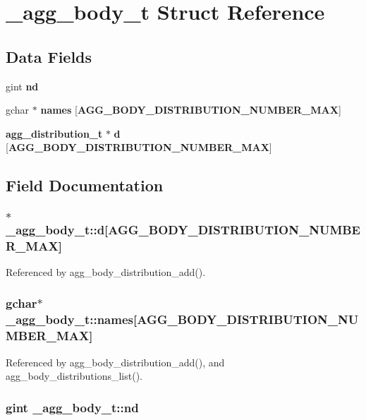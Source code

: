 \section{\+\_\+agg\+\_\+body\+\_\+t Struct Reference}
\label{struct__agg__body__t}
\subsection*{Data Fields}
\begin{DoxyCompactItemize}
\item 
gint {\bf nd}
\item 
gchar $\ast$ {\bf names} [{\bf A\+G\+G\+\_\+\+B\+O\+D\+Y\+\_\+\+D\+I\+S\+T\+R\+I\+B\+U\+T\+I\+O\+N\+\_\+\+N\+U\+M\+B\+E\+R\+\_\+\+M\+A\+X}]
\item 
{\bf agg\+\_\+distribution\+\_\+t} $\ast$ {\bf d} [{\bf A\+G\+G\+\_\+\+B\+O\+D\+Y\+\_\+\+D\+I\+S\+T\+R\+I\+B\+U\+T\+I\+O\+N\+\_\+\+N\+U\+M\+B\+E\+R\+\_\+\+M\+A\+X}]
\end{DoxyCompactItemize}


\subsection{Field Documentation}
\subsubsection[{d}]{$\ast$ \+\_\+agg\+\_\+body\+\_\+t\+::d[{\bf A\+G\+G\+\_\+\+B\+O\+D\+Y\+\_\+\+D\+I\+S\+T\+R\+I\+B\+U\+T\+I\+O\+N\+\_\+\+N\+U\+M\+B\+E\+R\+\_\+\+M\+A\+X}]}\label{struct__agg__body__t_ac459fd4ca7bdf550abc897bee54281eb}


Referenced by agg\+\_\+body\+\_\+distribution\+\_\+add().

\subsubsection[{names}]{\setlength{\rightskip}{0pt plus 5cm}gchar$\ast$ \+\_\+agg\+\_\+body\+\_\+t\+::names[{\bf A\+G\+G\+\_\+\+B\+O\+D\+Y\+\_\+\+D\+I\+S\+T\+R\+I\+B\+U\+T\+I\+O\+N\+\_\+\+N\+U\+M\+B\+E\+R\+\_\+\+M\+A\+X}]}\label{struct__agg__body__t_a59f8e2336fe6c8382c3f88e4a985fa1e}


Referenced by agg\+\_\+body\+\_\+distribution\+\_\+add(), and agg\+\_\+body\+\_\+distributions\+\_\+list().

\subsubsection[{nd}]{\setlength{\rightskip}{0pt plus 5cm}gint \+\_\+agg\+\_\+body\+\_\+t\+::nd}\label{struct__agg__body__t_a90b1b29ec82152eabb3d750cec4fbd75}

